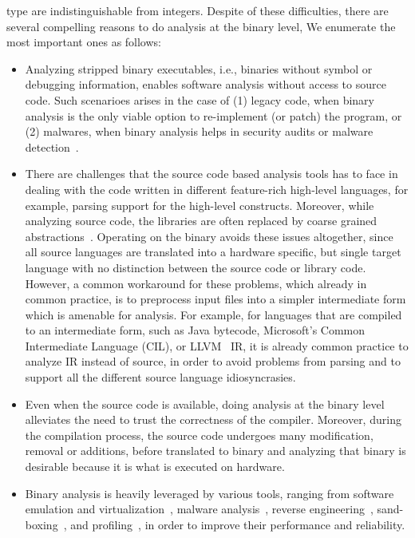          type are indistinguishable from integers.  Despite of these
         difficulties, there are several compelling reasons to do analysis at
         the binary level, We enumerate the most important ones as follows:
\begin{itemize}

    \item Analyzing stripped binary executables, i.e., binaries without symbol
    or debugging information, enables software analysis without access to
    source code. Such scenarioes arises in the case of (1) legacy code, when
    binary analysis is the only viable option to re-implement (or patch) the
    program, or (2) malwares, when binary analysis helps in security audits or
    malware
    detection~\cite{Christodorescu:2005,Andreas2007,Kinder:2005,Kinder:2010,Kolbitsch:2009}.
    
    \item There are challenges that the source code based analysis tools has to
    face  in dealing with the code written in different feature-rich high-level
    languages, for example, parsing support for  the high-level constructs.
    Moreover, while analyzing source code, the libraries are often replaced by
    coarse grained abstractions~\cite{libabs}. Operating on the binary avoids
    these issues altogether, since all source languages are translated into a
    hardware specific, but single target language with no distinction between
    the source code or library code. However, a common workaround for these
    problems, which already in common practice, is to preprocess input files
    into a simpler intermediate form which is amenable for analysis. For
    example, for languages that are compiled to an intermediate form, such as
    Java bytecode, Microsoft's Common Intermediate Language (CIL), or
    LLVM~\cite{Lattner:2004} IR, it is already common practice to analyze IR
    instead of source, in order to avoid problems from parsing and to support
    all the different source language idiosyncrasies.
    
    \item Even when the source code is available, doing analysis at the binary
    level alleviates the need to trust the correctness of the compiler.
    Moreover, during the compilation process, the source code undergoes many
    modification, removal or additions, before translated to binary and
    analyzing that binary is desirable because it is what is executed on
    hardware. 
    
    \item Binary analysis is heavily leveraged by various tools, ranging from
    software emulation and
    virtualization~\cite{QEMU:USENIX05,Valgrind:ENTCS03,DynamoRIO:2004,Pin:2005},
    malware analysis~\cite{BitBlaze:2008,BAP:CAV11,Egele:USENIX07,Yin:CCS07},
    reverse engineering~\cite{McSema:Recon14,Angr,Radare2},
    sand-boxing~\cite{Kiriansky:2002:SEV,Erlingsson:2006,Yee:2009}, and
    profiling~\cite{Harris:2005,Srivastava:1994}, in order to improve their
    performance and reliability.
\end{itemize}



